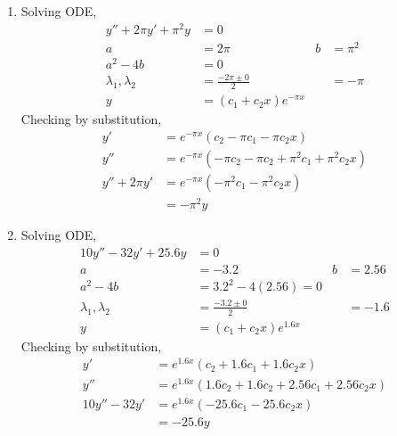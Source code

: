 \begin{enumerate}
    \item Solving ODE,
          \begin{align}
              y'' + 2\pi y' + \pi ^{2}y & = 0                                          \\
              a                         & = 2\pi                      & b & = \pi ^{2} \\
              a^{2} - 4b                & = 0                                          \\
              \lambda_{1}, \lambda_{2}  & = \frac{-2\pi \pm 0}{2}     &   & = -\pi     \\
              y                         & = (c_{1}+ c_{2}x)e^{-\pi x}
          \end{align}
          Checking by substitution,
          \begin{align}
              y'           & = e^{-\pi x}(c_{2} - \pi c_{1} - \pi c_{2}x)                        \\
              y''          & = e^{-\pi x}(-\pi c_{2}-\pi c_{2} + \pi ^{2}c_{1} + \pi ^{2}c_{2}x) \\
              y''+ 2\pi y' & = e^{-\pi x}(-\pi ^{2}c_{1} - \pi ^{2}c_{2}x)                       \\
                           & = -\pi ^{2}y
          \end{align}

    \item Solving ODE,
          \begin{align}
              10y'' - 32y' + 25.6y     & = 0                                     \\
              a                        & = -3.2                     & b & = 2.56 \\
              a^{2} - 4b               & = 3.2^{2} - 4(2.56) = 0                 \\
              \lambda_{1}, \lambda_{2} & = \frac{-3.2 \pm 0}{2}     &   & = -1.6 \\
              y                        & = (c_{1}+ c_{2}x)e^{1.6 x}
          \end{align}
          Checking by substitution,
          \begin{align}
              y'          & = e^{1.6 x}(c_{2} + 1.6 c_{1} + 1.6 c_{2}x)               \\
              y''         & = e^{1.6 x}(1.6 c_{2}+1.6 c_{2} + 2.56c_{1} + 2.56c_{2}x) \\
              10y''- 32y' & = e^{1.6 x}(-25.6c_{1} - 25.6c_{2}x)                      \\
                          & = -25.6y
          \end{align}


\end{enumerate}
